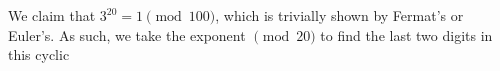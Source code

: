 \documentclass{report}
\begin{document}
\sol 

\sol We claim that $3^{20} = 1 \pmod{100}$, which is trivially shown by Fermat's or Euler's. As such, we take the exponent $\pmod{20}$ to find the last two digits in this cyclic 
\end{document}
